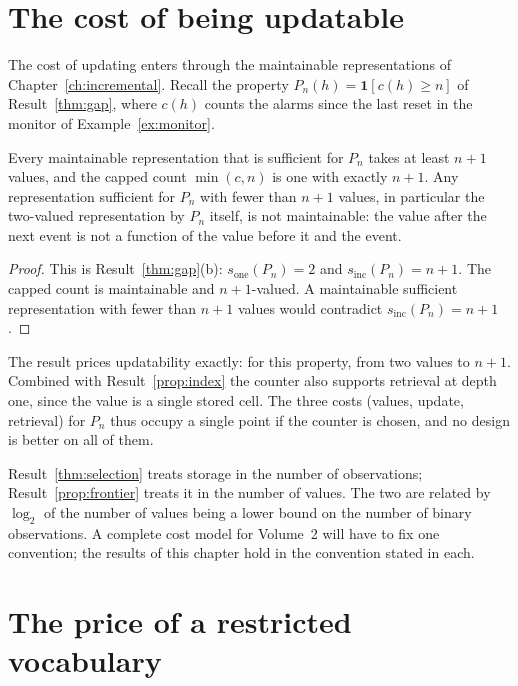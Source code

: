 \section{The cost of being updatable}

The cost of updating enters through the maintainable representations of Chapter~\ref{ch:incremental}. Recall the property $P_n(h)=\mathbf 1[c(h)\ge n]$ of Result~\ref{thm:gap}, where $c(h)$ counts the alarms since the last reset in the monitor of Example~\ref{ex:monitor}.

\begin{newresult}\label{prop:frontier}
Every maintainable representation that is sufficient for $P_n$ takes at least $n+1$ values, and the capped count $\min(c,n)$ is one with exactly $n+1$. Any representation sufficient for $P_n$ with fewer than $n+1$ values, in particular the two-valued representation by $P_n$ itself, is not maintainable: the value after the next event is not a function of the value before it and the event.
\end{newresult}
\begin{proof}
This is Result~\ref{thm:gap}(b): $s_{\mathrm{one}}(P_n)=2$ and $s_{\mathrm{inc}}(P_n)=n+1$. The capped count is maintainable and $n+1$-valued. A maintainable sufficient representation with fewer than $n+1$ values would contradict $s_{\mathrm{inc}}(P_n)=n+1$.
\end{proof}

The result prices updatability exactly: for this property, from two values to $n+1$. Combined with Result~\ref{prop:index} the counter also supports retrieval at depth one, since the value is a single stored cell. The three costs (values, update, retrieval) for $P_n$ thus occupy a single point if the counter is chosen, and no design is better on all of them.

\begin{remark}
Result~\ref{thm:selection} treats storage in the number of observations; Result~\ref{prop:frontier} treats it in the number of values. The two are related by $\log_2$ of the number of values being a lower bound on the number of binary observations. A complete cost model for Volume~2 will have to fix one convention; the results of this chapter hold in the convention stated in each.
\end{remark}


\section{The price of a restricted vocabulary}\label{sec:vocab}

